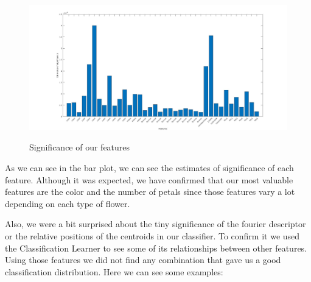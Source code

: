 \documentclass[11]{article}
\begin{document}
\begin{figure}[H]
    \centering
  \includegraphics[scale=0.25]{images/importance.jpg}
    \label{segmentation4}
    \caption{Significance of our features}
\end{figure}

As we can see in the bar plot, we can see the estimates of significance of each feature. Although it was expected, we have confirmed that our most valuable features are the color and the number of petals since those features vary a lot depending on each type of flower. 
\medskip

Also, we were a bit surprised about the tiny significance of the fourier descriptor or the relative positions of the centroids in our classifier. To confirm it we used the Classification Learner to see some of its relationships between other features. Using those features we did not find any combination that gave us a good classification distribution. Here we can see some examples: 
\end{document}
